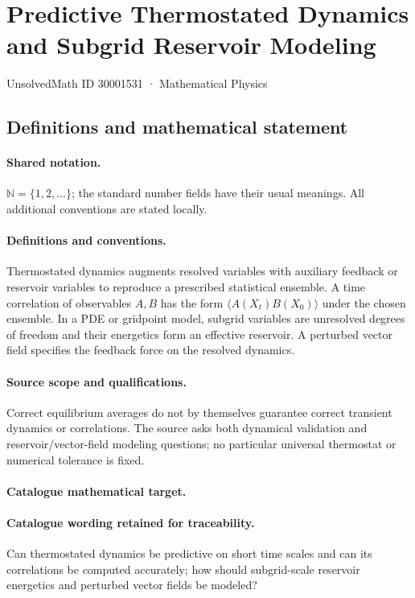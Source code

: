 \documentclass[11pt]{article}
\begin{document}
\setcounter{section}{30001530}
\section{Predictive Thermostated Dynamics and Subgrid Reservoir Modeling}\label{30001531}
{\small UnsolvedMath ID 30001531 · Mathematical Physics}
\subsection{Definitions and mathematical statement}

\paragraph{Shared notation.}$\mathbb N=\{1,2,\ldots\}$; the standard number fields have their usual meanings. All additional conventions are stated locally.


\paragraph{Definitions and conventions.} Thermostated dynamics augments resolved variables with auxiliary feedback or reservoir variables to reproduce a prescribed statistical ensemble. A time correlation of observables $A,B$ has the form $\langle A(X_t)B(X_0)\rangle$ under the chosen ensemble. In a PDE or gridpoint model, subgrid variables are unresolved degrees of freedom and their energetics form an effective reservoir. A perturbed vector field specifies the feedback force on the resolved dynamics.

\paragraph{Source scope and qualifications.} Correct equilibrium averages do not by themselves guarantee correct transient dynamics or correlations. The source asks both dynamical validation and reservoir/vector-field modeling questions; no particular universal thermostat or numerical tolerance is fixed.

\paragraph{Catalogue mathematical target.}
\paragraph{Catalogue wording retained for traceability.}
Can thermostated dynamics be predictive on short time scales and can its correlations be computed accurately; how should subgrid-scale reservoir energetics and perturbed vector fields be modeled?
\end{document}
